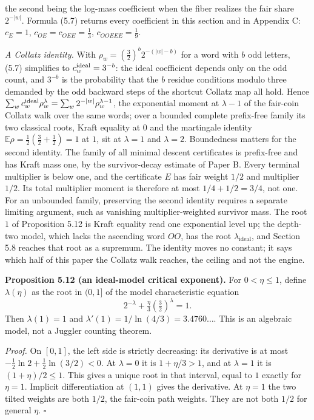 \documentclass[11pt,a4paper]{article}
\begin{document}
the second being the log-mass coefficient when the fiber realizes the
fair share \(2^{-|w|}\). Formula (5.7) returns every coefficient in this
section and in Appendix C: \(c_E=1\), \(c_{OE}=c_{OEE}=\tfrac13\),
\(c_{OOEEE}=\tfrac19\).

\emph{A Collatz identity.} With \(\rho_w=(\tfrac32)^b2^{-(|w|-b)}\) for
a word with \(b\) odd letters, (5.7) simplifies to
\(c^{\rm ideal}_w=3^{-b}\): the ideal coefficient depends only on the
odd count, and \(3^{-b}\) is the probability that the \(b\) residue
conditions modulo three demanded by the odd backward steps of the
shortcut Collatz map all hold. Hence
\(\sum_wc^{\rm ideal}_w\rho_w^{\lambda}=\sum_w2^{-|w|}\rho_w^{\lambda-1}\),
the exponential moment at \(\lambda-1\) of the fair-coin Collatz walk
over the same words; over a bounded complete prefix-free family its two
classical roots, Kraft equality at \(0\) and the martingale identity
\(\mathbb E\rho=\tfrac12(\tfrac32+\tfrac12)=1\) at \(1\), sit at
\(\lambda=1\) and \(\lambda=2\). Boundedness matters for the second
identity. The family of all minimal descent certificates is prefix-free
and has Kraft mass one, by the survivor-decay estimate of Paper B. Every
terminal multiplier is below one, and the certificate \(E\) has fair
weight \(1/2\) and multiplier \(1/2\). Its total multiplier moment is
therefore at most \(1/4+1/2=3/4\), not one. For an unbounded family,
preserving the second identity requires a separate limiting argument,
such as vanishing multiplier-weighted survivor mass. The root \(1\) of
Proposition 5.12 is Kraft equality read one exponential level up; the
depth-two model, which lacks the ascending word \(OO\), has the root
\(\lambda_{\mathrm{ideal}}\), and Section 5.8 reaches that root as a
supremum. The identity moves no constant; it says which half of this
paper the Collatz walk reaches, the ceiling and not the engine.

\textbf{Proposition 5.12 (an ideal-model critical exponent).} For
\(0<\eta\le1\), define \(\lambda(\eta)\) as the root in \((0,1]\) of the
model characteristic equation \[
2^{-\lambda}+\tfrac\eta3(\tfrac32)^\lambda=1.
\tag{5.8}
\] Then \(\lambda(1)=1\) and \(\lambda'(1)=1/\ln(4/3)=3.4760\ldots\).
This is an algebraic model, not a Juggler counting theorem.

\emph{Proof.} On \([0,1]\), the left side is strictly decreasing: its
derivative is at most \(-\tfrac12\ln2+\tfrac12\ln(3/2)<0\). At
\(\lambda=0\) it is \(1+\eta/3>1\), and at \(\lambda=1\) it is
\((1+\eta)/2\le1\). This gives a unique root in that interval, equal to
\(1\) exactly for \(\eta=1\). Implicit differentiation at \((1,1)\)
gives the derivative. At \(\eta=1\) the two tilted weights are both
\(1/2\), the fair-coin path weights. They are not both \(1/2\) for
general \(\eta\). \(\square\)
\end{document}
